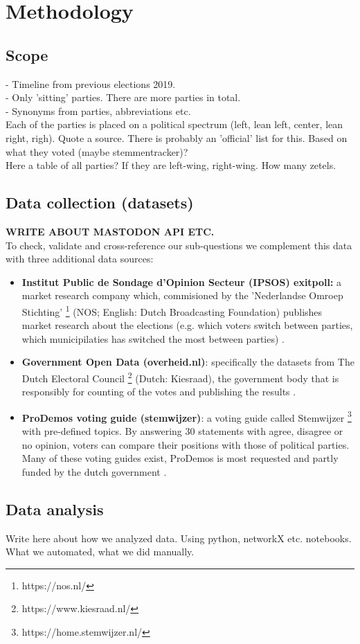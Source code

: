 \section{Methodology}

\subsection{Scope}

- Timeline from previous elections 2019. \\
- Only 'sitting' parties. There are more parties in total. \\
- Synonyms from parties, abbreviations etc. \\

Each of the parties is placed on a political spectrum (left, lean left, center, lean right, righ). Quote a source. There is probably an 'official' list for this. Based on what they voted (maybe stemmentracker)? \\

Here a table of all parties? If they are left-wing, right-wing. How many zetels.

\subsection{Data collection (datasets)}

\textbf{WRITE ABOUT MASTODON API ETC.} \\

To check, validate and cross-reference our sub-questions we complement this data with three additional data sources: 

\begin{itemize}
  \item \textbf{Institut Public de Sondage d'Opinion Secteur (IPSOS) exitpoll:} a market research company which, commisioned by the 'Nederlandse Omroep Stichting' \footnote{https://nos.nl/} (NOS; English: Dutch Broadcasting Foundation) publishes market research about the elections (e.g. which voters switch between parties, which municipilaties has switched the most between parties) \cite{nos}.
  \item \textbf{Government Open Data (overheid.nl)}: specifically the datasets from The Dutch Electoral Council \footnote{https://www.kiesraad.nl/} (Dutch: Kiesraad), the government body that is responsibly for counting of the votes and publishing the results \cite{kiesraad}.
  \item \textbf{ProDemos voting guide (stemwijzer)}: a voting guide called Stemwijzer \footnote{https://home.stemwijzer.nl/} with pre-defined topics. By answering 30 statements with agree, disagree or no opinion, voters can compare their positions with those of political parties. Many of these voting guides exist, ProDemos is most requested and partly funded by the dutch government \cite{prodemos}.
\end{itemize}

\subsection{Data analysis}

Write here about how we analyzed data. Using python, networkX etc. notebooks. What we automated, what we did manually.